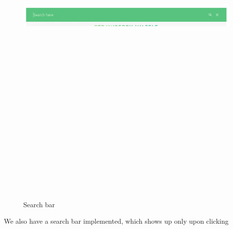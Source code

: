 \begin{figure}[!hb]
\centering
\caption[Search bar]{Search bar}%
\label{fig:search_bar}
\includegraphics[width=\linewidth,height=20cm,keepaspectratio]{img/search_bar}
\end{figure}

We also have a search bar implemented, which shows up only upon clicking 


